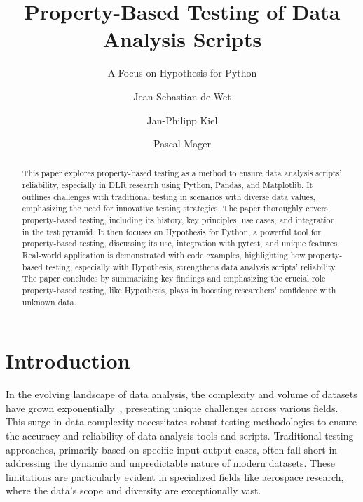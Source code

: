 \documentclass[runningheads]{llncs}
\begin{document}
%
\title{Property-Based Testing of Data Analysis Scripts}
\subtitle{A Focus on Hypothesis for Python}
%
%
\author{Jean-Sebastian de Wet \and
Jan-Philipp Kiel \and
Pascal Mager}
%
%
%
\maketitle              %
%
\begin{abstract}
This paper explores property-based testing as a method to ensure data analysis scripts' reliability, especially in DLR research using Python, Pandas, and Matplotlib. It outlines challenges with traditional testing in scenarios with diverse data values, emphasizing the need for innovative testing strategies. The paper thoroughly covers property-based testing, including its history, key principles, use cases, and integration in the test pyramid. It then focuses on Hypothesis for Python, a powerful tool for property-based testing, discussing its use, integration with pytest, and unique features. Real-world application is demonstrated with code examples, highlighting how property-based testing, especially with Hypothesis, strengthens data analysis scripts' reliability. The paper concludes by summarizing key findings and emphasizing the crucial role property-based testing, like Hypothesis, plays in boosting researchers' confidence with unknown data.

\end{abstract}
%
%
%
\section{Introduction}
In the evolving landscape of data analysis, the complexity and volume of datasets have grown exponentially~\cite{Taylor2023}, presenting unique challenges across various fields. This surge in data complexity necessitates robust testing methodologies to ensure the accuracy and reliability of data analysis tools and scripts. Traditional testing approaches, primarily based on specific input-output cases, often fall short in addressing the dynamic and unpredictable nature of modern datasets. These limitations are particularly evident in specialized fields like aerospace research, where the data's scope and diversity are exceptionally vast.
\end{document}
